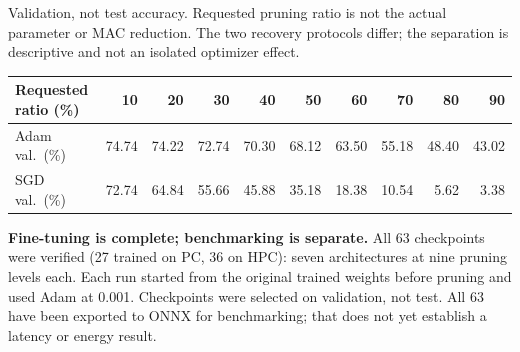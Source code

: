 \documentclass[10pt,a4paper]{article}
\newcommand{\smallcap}[1]{{\footnotesize\color{navy}#1}\par}
\begin{document}
\begin{center}
\end{center}\vspace{-5pt}
\smallcap{Validation, not test accuracy. Requested pruning ratio is not the actual parameter or MAC reduction. The two recovery protocols differ; the separation is descriptive and not an isolated optimizer effect.}
\begin{center}\small
\begin{tabular}{@{}lrrrrrrrrr@{}}\toprule
Requested ratio (\%) & 10 & 20 & 30 & 40 & 50 & 60 & 70 & 80 & 90\\\midrule
Adam val.\ (\%) & 74.74 & 74.22 & 72.74 & 70.30 & 68.12 & 63.50 & 55.18 & 48.40 & 43.02\\
SGD val.\ (\%) & 72.74 & 64.84 & 55.66 & 45.88 & 35.18 & 18.38 & 10.54 & 5.62 & 3.38\\
\bottomrule\end{tabular}
\end{center}

\textbf{Fine-tuning is complete; benchmarking is separate.} All 63 checkpoints were verified (27 trained on PC, 36 on HPC): seven architectures at nine pruning levels each. Each run started from the original trained weights before pruning and used Adam at 0.001. Checkpoints were selected on validation, not test. All 63 have been exported to ONNX for benchmarking; that does not yet establish a latency or energy result.
\end{document}
